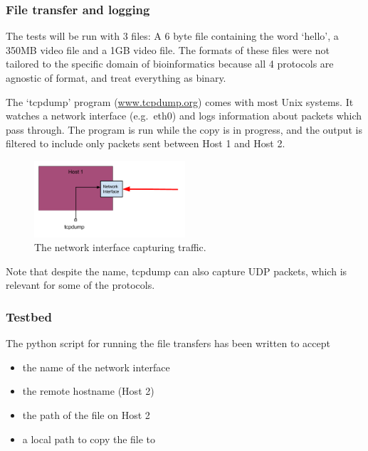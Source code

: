 \documentclass{sig-alternate-05-2015}
\begin{document}
\subsubsection{File transfer and logging}
The tests will be run with 3 files: A 6 byte file containing the word `hello', a 350MB video file and a 1GB video file. The formats of these files were not tailored to the specific domain of bioinformatics because all 4 protocols are agnostic of format, and treat everything as binary.

The `tcpdump' program (\url{www.tcpdump.org}) comes with most Unix systems. It watches a network interface (e.g.\ eth0) and logs information about packets which pass through. The program is run while the copy is in progress, and the output is filtered to include only packets sent between Host 1 and Host 2.
\begin{figure}[H]
	\label{fig:interface_example}
	\centering
	\includegraphics[width=0.5\textwidth]{img/if_example.png}
	\caption{The network interface capturing traffic.}
\end{figure}

Note that despite the name, tcpdump can also capture UDP packets, which is relevant for some of the protocols.

\subsubsection{Testbed}
The python script for running the file transfers has been written to accept
\begin{itemize}
	\item the name of the network interface
	\item the remote hostname (Host 2)
	\item the path of the file on Host 2
	\item a local path to copy the file to
\end{itemize}
\end{document}
